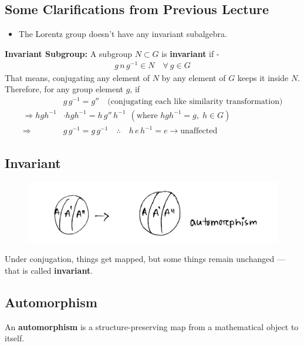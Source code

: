 \documentclass[14pt]{article} %
\begin{document}
\subsection*{Some Clarifications from Previous Lecture}
\begin{itemize}
    \item The Lorentz group doesn't have any invariant subalgebra.
\end{itemize}
\textbf{Invariant Subgroup: } A subgroup $N \subset G$ is \textbf{invariant} if -
\begin{align*}
g\,n\,g^{-1} \in N \quad \forall~ g \in G
\end{align*}
That means, conjugating any element of $N$ by any element of $G$ keeps it inside $N$. Therefore, for any group element $g$, if
\begin{align*}
& g\,g^{-1} = g''\quad \text{(conjugating each like similarity transformation)} \\
\Rightarrow h g h^{-1} &\cdot h g h^{-1} = h\,g''\,h^{-1}~~(\text{where } hgh^{-1} = g, \; h \in G )\\
\Rightarrow &g\,g^{-1} = g\,g^{-1} \quad \therefore \quad h\,e\,h^{-1} = e \rightarrow \text{unaffected}
\end{align*}
\subsection*{Invariant} 
\vspace{-1cm}
\begin{figure}[H]
\centering
\includegraphics[width=0.7\linewidth]{L3_1.jpg}
\caption*{}
\end{figure}
\vspace{-1cm}
\noindent
Under conjugation, things get mapped, but some things remain unchanged — that is called \textbf{invariant}.

\subsection*{Automorphism}
An \textbf{automorphism} is a structure-preserving map from a mathematical object to itself.
\end{document}
